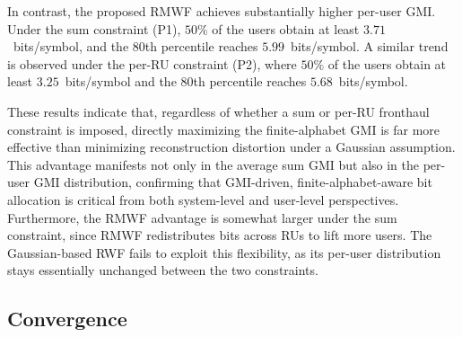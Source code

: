 \documentclass[10pt, twocolumn, comsoc]{IEEEtran}
\begin{document}
In contrast, the proposed RMWF achieves substantially higher per-user GMI. 
Under the sum constraint (P1), $50\%$ of the users obtain at least $3.71$~bits/symbol, and the $80$th percentile reaches $5.99$~bits/symbol. 
A similar trend is observed under the per-RU constraint (P2), where $50\%$ of the users obtain at least $3.25$~bits/symbol and the $80$th percentile reaches $5.68$~bits/symbol.

These results indicate that, regardless of whether a sum or per-RU fronthaul constraint is imposed, directly maximizing the finite-alphabet GMI is far more effective than minimizing reconstruction distortion under a Gaussian assumption.
This advantage manifests not only in the average sum GMI but also in the per-user GMI distribution, confirming that GMI-driven, finite-alphabet-aware bit allocation is critical from both system-level and user-level perspectives.
Furthermore, the RMWF advantage is somewhat larger under the sum constraint, since RMWF redistributes bits across RUs to lift more users.
The Gaussian-based RWF fails to exploit this flexibility, as its per-user distribution stays essentially unchanged between the two constraints.




\subsection{Convergence}
\label{subsec:convergence}


\end{document}
